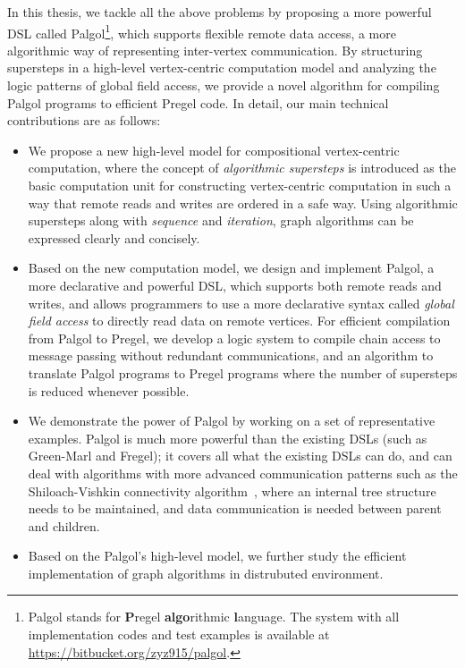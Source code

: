 \documentclass{sokendai_thesis} %
\begin{document}
In this thesis, we tackle all the above problems by proposing a more powerful DSL called Palgol\footnote{Palgol stands for {\bf P}regel {\bf algo}rithmic {\bf l}anguage.
The system with all implementation codes and test examples is available at \url{https://bitbucket.org/zyz915/palgol}.}, which supports flexible remote data access, a more algorithmic way of representing inter-vertex communication.
By structuring supersteps in a high-level vertex-centric computation model and analyzing the logic patterns of global field access, we provide a novel algorithm for compiling Palgol programs to efficient Pregel code. 
In detail, our main technical contributions are as follows:
\begin{itemize}\setlength\itemsep{0em}
\item
 We propose a new high-level model for compositional vertex-centric computation, where the concept of \emph{algorithmic supersteps} is introduced as the basic computation unit for constructing vertex-centric computation in such a way that remote reads and writes are ordered in a safe way.
 Using algorithmic supersteps along with \emph{sequence} and \emph{iteration}, graph algorithms can be expressed clearly and concisely.
\item
 Based on the new computation model, we design and implement Palgol, a more declarative and powerful DSL, which supports both remote reads and writes, and allows programmers to use a more declarative syntax called \emph{global field access} to directly read data on remote vertices.
 For efficient compilation from Palgol to Pregel, we develop a logic system to compile chain access to message passing without redundant communications, and an algorithm to translate Palgol programs to Pregel programs where the number of supersteps is reduced whenever possible.
\item
 We demonstrate the power of Palgol by working on a set of representative examples.
 Palgol is much more powerful than the existing DSLs (such as Green-Marl and Fregel); it covers all what the existing DSLs can do, and can deal with algorithms with more advanced communication patterns such as the Shiloach-Vishkin connectivity algorithm~\cite{connectivity}, where an internal tree structure needs to be maintained, and data communication is needed between parent and children.
\item
 Based on the Palgol's high-level model, we further study the efficient implementation of graph algorithms in distrubuted environment.

\end{itemize}
\end{document}
